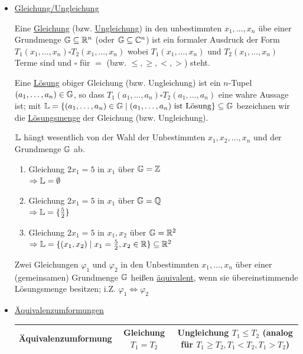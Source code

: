 \begin{itemize}
	\clearpage
	\item \ul{Gleichung/Ungleichung}
	
	Eine \ul{Gleichung} (bzw. \ul{Ungleichung}) in den unbestimmten $x_1,\ldots,x_n$ übe einer Grundmenge $\mathbb{G}\subseteq\mathbb{R}^n$ (oder $\mathbb{G}\subseteq\mathbb{C}^n$) ist ein formaler Ausdruck der Form $T_1(x_1,\ldots,x_n) \square T_2(x_1,\ldots,x_n)$ wobei $T_1(x_1,\ldots,x_n)$ und $T_2(x_1,\ldots,x_n)$ Terme sind und $\square$ für $=$ (bzw. $\le,\ge,<,>$) steht.
	
	Eine \ul{Lösung} obiger Gleichung (bzw. Ungleichung) ist ein $n$-Tupel $(a_1,\ldots,a_n)\in\mathbb{G}$, so dass $T_1(a_1,\ldots,a_n) \square T_2(a_1,\ldots,a_n)$ eine wahre Aussage ist; mit $\mathbb{L}=\{(a_1,\ldots,a_n)\in\mathbb{G}\mid(a_1,\ldots,a_n)\text{ ist Lösung}\}\subseteq\mathbb{G}$ bezeichnen wir die \ul{Lösungsmenge} der Gleichung (bzw. Ungleichung).
	
	\Bem $\mathbb{L}$ hängt wesentlich von der Wahl der Unbestimmten $x_1,x_2,\ldots,x_n$ und der Grundmenge $\mathbb{G}$ ab.

	\clearpage
	\Bsps
	\begin{enumerate}
		\item Gleichung $2x_1 = 5$ in $x_1$ über $\mathbb{G}=\mathbb{Z}$\\
		$\Rightarrow \mathbb{L}=\emptyset$
		\item Gleichung $2x_1 = 5$ in $x_1$ über $\mathbb{G}=\mathbb{Q}$\\
		$\Rightarrow \mathbb{L}=\{\frac{5}{2}\}$
		\item Gleichung $2x_1 = 5$ in $x_1,x_2$ über $\mathbb{G}=\mathbb{R}^2$\\
		$\Rightarrow \mathbb{L}=\{(x_1,x_2)\mid x_1=\frac{5}{2}, x_2\in\mathbb{R}\}\subseteq\mathbb{R}^2$
	\end{enumerate}
	
	\Def Zwei Gleichungen $\varphi_1$ und $\varphi_2$ in den Unbestimmten $x_1,\ldots,x_n$ über einer (gemeinsamen) Grundmenge $\mathbb{G}$ heißen \ul{äquivalent}, wenn sie übereinstimmende Lösungsmenge besitzen; i.Z. $\varphi_1\Leftrightarrow\varphi_2$
	
	\clearpage
	\item \ul{Äquivalenzumformungen}
	
	\begin{longtable}{c|c|c}
		\parbox{0.3\linewidth}{\vspace{2em}Äquivalenzumformung\vspace{2em}} &
		\parbox{0.25\linewidth}{\vspace{2em}Gleichung\\$T_1=T_2$\vspace{2em}} &
		\parbox{0.5\linewidth}{\vspace{2em}Ungleichung $T_1\le T_2$\\(analog für $T_1\ge T_2,T_1 < T_2,T_1 > T_2$)\vspace{2em}}\\
		\hline
		

\end{longtable}
\end{itemize}
